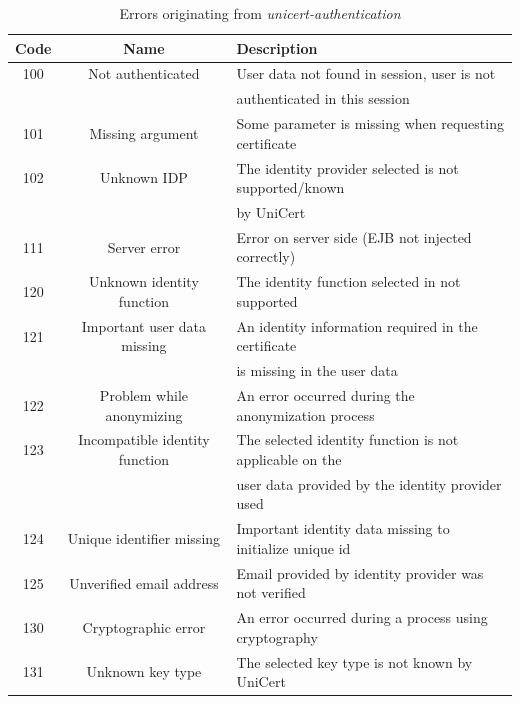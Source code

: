 \documentclass[oneside]{scrreprt}
\newcommand{\unicert}{\mbox{UniCert}}
\begin{document}
\begin{table}[ht]
\centering
\begin{tabular}{|c|c|l|}
  \hline
  Code & Name & Description\\
  \hline
  100 & Not authenticated & User data not found in session, user is not\\ &&  authenticated in this session\\
  101 & Missing argument & Some parameter is missing when requesting certificate \\
  102 & Unknown IDP & The identity provider selected is not supported/known\\ &&  by \unicert\\
  111 & Server error &  Error on server side (EJB not injected correctly)\\
  120 & Unknown identity function & The identity function selected in not supported \\
  121 & Important user data missing & An identity information required in the certificate\\ &&  is missing in the user data\\
  122 & Problem while anonymizing & An error occurred during the anonymization process\\
  123 & Incompatible identity function & The selected identity function is not applicable on the\\ &&   user data provided by the identity provider used\\
  124 & Unique identifier missing & Important identity data missing to initialize unique id\\
  125 & Unverified email address & Email provided by identity provider was not verified\\
  130 & Cryptographic error & An error occurred during a process using cryptography\\
  131 & Unknown key type & The selected key type is not known by \unicert\\
  \hline
\end{tabular}
\caption{Errors originating from \textit{unicert-authentication}}
\label{t:errorCodes1}
\end{table}
\end{document}

